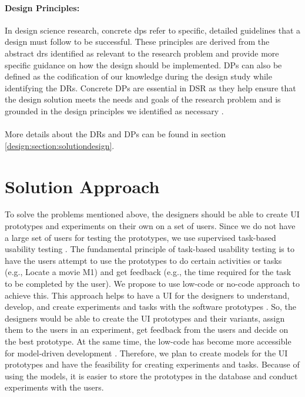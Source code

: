 \paragraph*{Design Principles:}
In design science research, concrete \ac{dp}s refer to specific, detailed guidelines that a design must follow to be successful. 
These principles are derived from the abstract \ac{dr}s identified as relevant to the research problem and provide more specific guidance on how the design should be implemented.
DPs can also be defined as the codification of our knowledge during the design study while identifying the DRs. 
Concrete DPs are essential in DSR as they help ensure that the design solution meets the needs and goals of the research problem and is grounded in the design principles we identified as necessary \cite{misc:dsr:webster}.\\\\
More details about the DRs and DPs can be found in section \ref{design:section:solutiondesign}.

\section{Solution Approach}
\label{introduction:section:solution}

To solve the problems mentioned above, the designers should be able to create UI prototypes and experiments on their own on a set of users.
Since we do not have a large set of users for testing the prototypes, we use supervised task-based usability testing \cite{article:dataanalysis:supervisedtest}.
The fundamental principle of task-based usability testing is to have the users attempt to use the prototypes to do certain activities or tasks (e.g., Locate a movie M1) and get feedback (e.g., the time required for the task to be completed by the user).
We propose to use low-code or no-code approach to achieve this.
This approach helps to have a UI for the designers to understand, develop, and create experiments and tasks with the software prototypes \cite{paper:lowcode:khorram}.
So, the designers would be able to create the UI prototypes and their variants, assign them to the users in an experiment, get feedback from the users and decide on the best prototype.
At the same time, the low-code has become more accessible for model-driven development \cite{article:lowcode:modeldriven}.
Therefore, we plan to create models for the UI prototypes and have the feasibility for creating experiments and tasks. 
Because of using the models, it is easier to store the prototypes in the database and conduct experiments with the users. 

